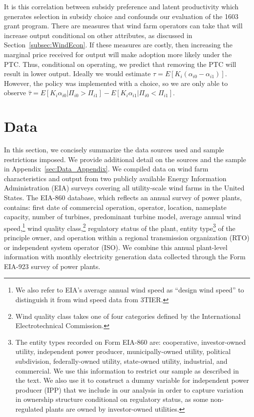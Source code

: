 \documentclass[12pt]{article}
\begin{document}
It is this correlation between subsidy preference and latent productivity which generates selection in subsidy choice and confounds our evaluation of the 1603 grant program. There are measures that wind farm operators can take that will increase output conditional on other attributes, as discussed in Section~\ref{subsec:WindEcon}. If these measures are costly, then increasing the marginal price received for output will make adoption more likely under the PTC. Thus, conditional on operating, we predict that removing the PTC will result in lower output. Ideally we would estimate $\tau=E[K_{i}(\alpha_{i0}-\alpha_{i1})]$. However, the policy was implemented with a choice, so we are only able to observe $\hat{\tau}=E[K_{i}\alpha_{i0}|\Pi_{i0}>\Pi_{i1}]-E[K_{i}\alpha_{i1}|\Pi_{i0}<\Pi_{i1}]$. 

\section{Data\label{sec:Data}}

In this section, we concisely summarize the data sources used and sample restrictions imposed. We provide additional detail on the sources and the sample in Appendix~\ref{sec:Data_Appendix}. We compiled data on wind farm characteristics and output from two publicly available Energy Information Administration (EIA) surveys covering all utility-scale wind farms in the United States. The EIA-860 database, which reflects an annual survey of power plants, contains: first date of commercial operation, operator, location, nameplate capacity, number of turbines, predominant turbine model, average annual wind speed,\footnote{We also refer to EIA's average annual wind speed as ``design wind speed'' to distinguish it from wind speed data from 3TIER.} wind quality class,\footnote{Wind quality class takes one of four categories defined by the International Electrotechnical Commission.} regulatory status of the plant, entity type\footnote{The entity types recorded on Form EIA-860 are: cooperative, investor-owned utility, independent power producer, municipally-owned utility, political subdivision, federally-owned utility, state-owned utility, industrial, and commercial. We use this information to restrict our sample as described in the text. We also use it to construct a dummy variable for independent power producer (IPP) that we include in our analysis in order to capture variation in ownership structure conditional on regulatory status, as some non-regulated plants are owned by investor-owned utilities.} of the principle owner, and operation within a regional transmission organization (RTO) or independent system operator (ISO). We combine this annual plant-level information with monthly electricity generation data collected through the Form EIA-923 survey of power plants.
\end{document}
